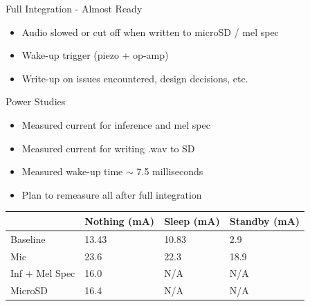 \begin{frame}{Full Integration - Almost Ready}
    \begin{itemize}
        \item Audio slowed or cut off when written to microSD / mel spec
        \item Wake-up trigger (piezo + op-amp)
        \item Write-up on issues encountered, design decisions, etc.
    \end{itemize}
\end{frame}

\begin{frame}{Power Studies}
    \begin{itemize}
        \item Measured current for inference and mel spec 
        \item Measured current for writing .wav to SD
        \item Measured wake-up time $\sim$ 7.5 milliseconds
        \item Plan to remeasure all after full integration
    \end{itemize}
    \begin{center}
        \begin{table}[]
        \begin{tabular}{llll}
        \hline
                & Nothing (mA) & Sleep (mA) & Standby (mA) \\ \hline
        Baseline       & 13.43        & 10.83      & 2.9          \\
        Mic            & 23.6         & 22.3       & 18.9         \\
        Inf + Mel Spec & 16.0         & N/A        & N/A          \\
        MicroSD        & 16.4         & N/A        & N/A          \\ \hline
        \end{tabular}
        \end{table}
    \end{center}

\end{frame}

